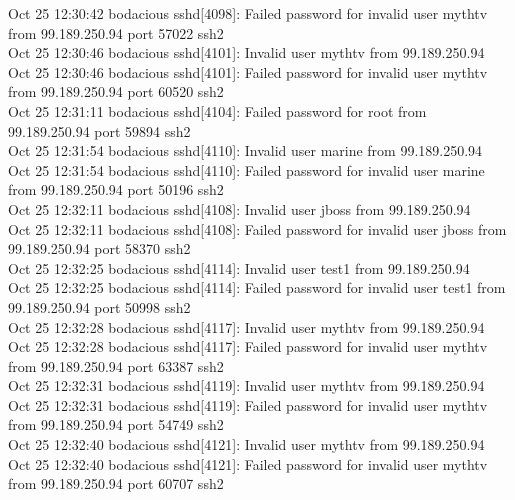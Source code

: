 {Oct 25 12:30:42 bodacious sshd[4098]: Failed password for invalid user mythtv from 99.189.250.94 port 57022 ssh2\\
Oct 25 12:30:46 bodacious sshd[4101]: Invalid user mythtv from 99.189.250.94\\
Oct 25 12:30:46 bodacious sshd[4101]: Failed password for invalid user mythtv from 99.189.250.94 port 60520 ssh2\\
Oct 25 12:31:11 bodacious sshd[4104]: Failed password for root from 99.189.250.94 port 59894 ssh2\\
Oct 25 12:31:54 bodacious sshd[4110]: Invalid user marine from 99.189.250.94\\
Oct 25 12:31:54 bodacious sshd[4110]: Failed password for invalid user marine from 99.189.250.94 port 50196 ssh2\\
Oct 25 12:32:11 bodacious sshd[4108]: Invalid user jboss from 99.189.250.94\\
Oct 25 12:32:11 bodacious sshd[4108]: Failed password for invalid user jboss from 99.189.250.94 port 58370 ssh2\\
Oct 25 12:32:25 bodacious sshd[4114]: Invalid user test1 from 99.189.250.94\\
Oct 25 12:32:25 bodacious sshd[4114]: Failed password for invalid user test1 from 99.189.250.94 port 50998 ssh2\\
Oct 25 12:32:28 bodacious sshd[4117]: Invalid user mythtv from 99.189.250.94\\
Oct 25 12:32:28 bodacious sshd[4117]: Failed password for invalid user mythtv from 99.189.250.94 port 63387 ssh2\\
Oct 25 12:32:31 bodacious sshd[4119]: Invalid user mythtv from 99.189.250.94\\
Oct 25 12:32:31 bodacious sshd[4119]: Failed password for invalid user mythtv from 99.189.250.94 port 54749 ssh2\\
Oct 25 12:32:40 bodacious sshd[4121]: Invalid user mythtv from 99.189.250.94\\
Oct 25 12:32:40 bodacious sshd[4121]: Failed password for invalid user mythtv from 99.189.250.94 port 60707 ssh2\\
}